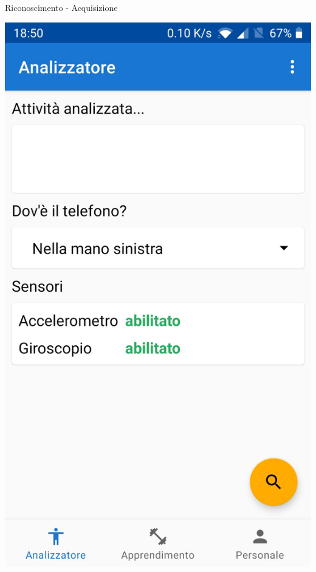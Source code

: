 \begin{tframe}{Riconoscimento - Acquisizione}
\begin{minipage}{0.35\textwidth}
        \centering\includegraphics[scale = 0.09]{assets/images/screenshots/analisi.jpg}        

    \end{minipage}%

\end{tframe}